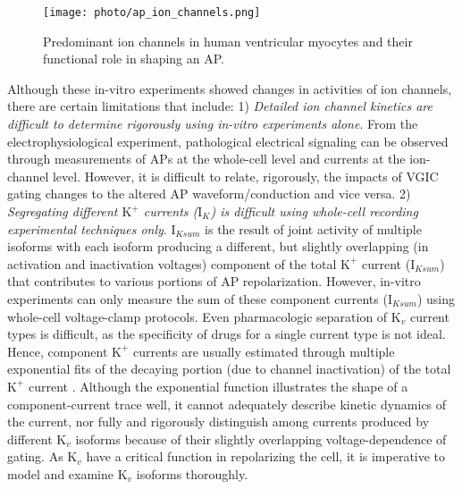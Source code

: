 \documentclass[journal]{IEEEtran}
\begin{document}
\begin{figure}
    \label{fig2}
    \centering
    \texttt{[image: photo/ap\_ion\_channels.png]}
    \caption{Predominant ion channels in human ventricular myocytes and their functional role in shaping an AP.}
    \label{fig:my_label}
\end{figure}

Although these in-vitro experiments showed changes in activities of ion channels, there are certain limitations that include: 1) \textit{Detailed ion channel kinetics are difficult to determine rigorously using in-vitro experiments alone}. From the electrophysiological experiment, pathological electrical signaling can be observed through measurements of APs at the whole-cell level and currents at the ion-channel level. However, it is difficult to relate, rigorously, the impacts of VGIC gating changes to the altered AP waveform/conduction and vice versa. 2) \textit{Segregating different $\text{K}^{+}$ currents ($\text{I}_{K}$) is difficult using whole-cell recording experimental techniques only}. $\text{I}_{Ksum}$ is the result of joint activity of multiple isoforms with each isoform producing a different, but slightly overlapping (in activation and inactivation voltages) component of the total $\text{K}^{+}$ current ($\text{I}_{Ksum}$) \cite{du2017} that contributes to various portions of AP repolarization. However, in-vitro experiments can only measure the sum of these component currents ($\text{I}_{Ksum}$) using whole-cell voltage-clamp protocols. Even pharmacologic separation of $\text{K}_{v}$ current types is difficult, as the specificity of drugs for a single current type is not ideal. Hence, component $\text{K}^{+}$ currents are usually estimated through multiple exponential fits of the decaying portion (due to channel inactivation) of the total $\text{K}^{+}$ current \cite{brunet2004heterogeneous}. Although the exponential function illustrates the shape of a component-current trace well, it cannot adequately describe kinetic dynamics of the current, nor fully and rigorously distinguish among currents produced by different $\text{K}_{v}$ isoforms because of their slightly overlapping voltage-dependence of gating. As $\text{K}_{v}$ have a critical function in repolarizing the cell, it is imperative to model and examine $\text{K}_{v}$ isoforms thoroughly.
\end{document}
